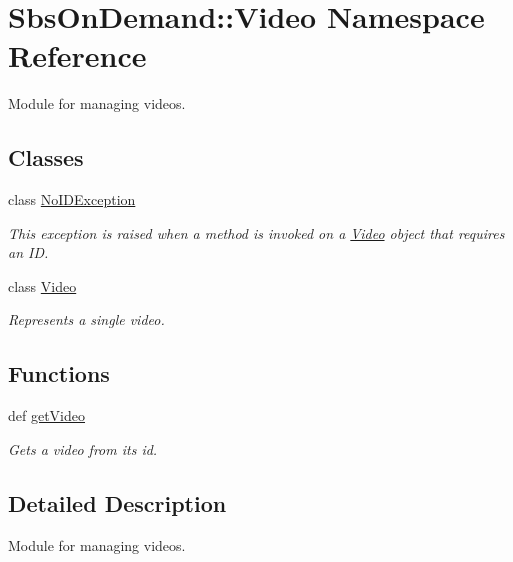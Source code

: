 \hypertarget{namespace_sbs_on_demand_1_1_video}{
\section{\-Sbs\-On\-Demand\-:\-:\-Video \-Namespace \-Reference}
\label{namespace_sbs_on_demand_1_1_video}
}


\-Module for managing videos.  


\subsection*{\-Classes}
\begin{DoxyCompactItemize}
\item 
class \hyperlink{class_sbs_on_demand_1_1_video_1_1_no_i_d_exception}{\-No\-I\-D\-Exception}
\begin{DoxyCompactList}\small\item\em \-This exception is raised when a method is invoked on a \hyperlink{class_sbs_on_demand_1_1_video_1_1_video}{\-Video} object that requires an \-I\-D. \end{DoxyCompactList}\item 
class \hyperlink{class_sbs_on_demand_1_1_video_1_1_video}{\-Video}
\begin{DoxyCompactList}\small\item\em \-Represents a single video. \end{DoxyCompactList}\end{DoxyCompactItemize}
\subsection*{\-Functions}
\begin{DoxyCompactItemize}
\item 
def \hyperlink{namespace_sbs_on_demand_1_1_video_a03501563d4529c9e324e2acc22828ba9}{get\-Video}
\begin{DoxyCompactList}\small\item\em \-Gets a video from its id. \end{DoxyCompactList}\end{DoxyCompactItemize}


\subsection{\-Detailed \-Description}
\-Module for managing videos. 

